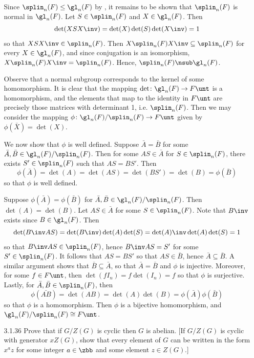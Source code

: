 \begin{sol}
    Since $\splin_n(F) \leq \gl_n(F)$ by , it remains to be shown that $\splin_n(F)$ is normal in $\gl_n(F)$.
	Let $S \in \splin_n(F)$ and $X \in \gl_n(F)$.
	Then
    \[
    	\det(XSX\inv) = \det(X)\det(S)\det(X\inv) = 1
    \]
    so that $XSX\inv \in \splin_n(F)$.
	Then $X\splin_n(F)X\inv \subseteq \splin_n(F)$ for every $X \in \gl_n(F)$, and since conjugation is an isomorphism, $X\splin_n(F)X\inv = \splin_n(F)$.
	Hence, $\splin_n(F) \nsub \gl_n(F)$.

    Observe that a normal subgroup corresponds to the kernel of some homomorphism.
	It is clear that the mapping $\det \colon \gl_n(F) \to F\unt$ is a homomorphism, and the elements that map to the identity in $F\unt$ are precisely those matrices with determinant 1, i.e. $\splin_n(F)$.
	Then we may consider the mapping $\phi \colon \gl_n(F)/\splin_n(F) \to F\unt$ given by $\phi(\bar X) = \det(X)$.

    We now show that $\phi$ is well defined.
	Suppose $\bar A = \bar B$ for some $\bar A, \bar B \in \gl_n(F)/\splin_n(F)$.
	Then for some $AS \in \bar A$ for $S \in \splin_n(F)$, there exists $S' \in \splin_n(F)$ such that $AS = BS'$.
	Then
    \[
    	\phi(\bar A) = \det(A) = \det(AS) = \det(BS') = \det(B) = \phi(\bar B)
    \]
    so that $\phi$ is well defined.

    Suppose $\phi(\bar A) = \phi(\bar B)$ for $\bar A, \bar B \in \gl_n(F)/\splin_n(F)$.
	Then $\det(A) = \det(B)$.
	Let $AS \in \bar A$ for some $S \in \splin_n(F)$.
	Note that $B\inv$ exists since $B \in \gl_n(F)$.
	Then
    \[
    	\det(B\inv AS) = \det(B\inv)\det(A)\det(S) = \det(A)\inv\det(A)\det(S) = 1
    \]
    so that $B\inv AS \in \splin_n(F)$, hence $B\inv AS = S'$ for some $S' \in \splin_n(F)$.
	It follows that $AS = BS'$ so that $AS \in \bar B$, hence $\bar A \subseteq \bar B$.
	A similar argument shows that $\bar B \subseteq \bar A$, so that $\bar A = \bar B$ and $\phi$ is injective.
	Moreover, for some $f \in F\unt$, then $\det(fI_n) = f\det(I_n) = f$ so that $\phi$ is surjective.
	Lastly, for $\bar A, \bar B \in \splin_n(F)$, then
    \[
    	\phi(\bar{AB}) = \det(AB) = \det(A)\det(B) = \phi(\bar A)\phi(\bar B)
    \]
    so that $\phi$ is a homomorphism.
	Then $\phi$ is a bijective homomorphism, and $\gl_n(F)/\splin_n(F) \cong F\unt$.
\end{sol}

\begin{exercise}{3.1.36} 
    Prove that if $G/Z(G)$ is cyclic then $G$ is abelian. [If $G/Z(G)$ is cyclic with generator $xZ(G)$, show that every element of $G$ can be written in the form $x^a z$ for some integer $a \in \zbb$ and some element $z \in Z(G)$.]
\end{exercise}

